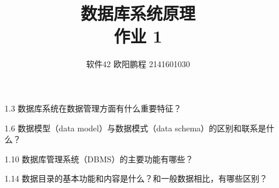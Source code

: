 \documentclass[UTF8]{ctexart}
\title{数据库系统原理 \\ 作业 1}
\author{软件42 欧阳鹏程 2141601030}
\begin{document}
\maketitle

\begin{itemize}
	\item[1.3] 数据库系统在数据管理方面有什么重要特征？
	\item[1.6] 数据模型（data model）与数据模式（data schema）的区别和联系是什么？
	\item[1.10] 数据库管理系统（DBMS）的主要功能有哪些？
	\item[1.14] 数据目录的基本功能和内容是什么？和一般数据相比，有哪些区别？
\end{itemize}
\end{document}
